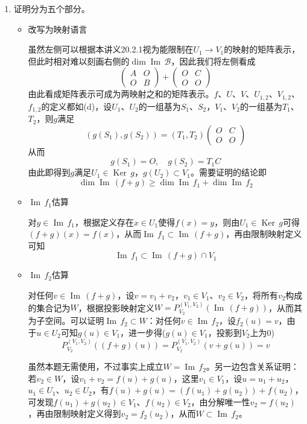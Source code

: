 \documentclass[a4paper,UTF8,fontset=windows,AutoFakeBold]{ctexart}
\DeclareMathOperator{\im}{Im\,}
\DeclareMathOperator{\Ker}{Ker\,}
\newcommand*{\mb}{\mathcal{B}}
\newcommand*{\note}{\noindent *}
\begin{document}
\begin{enumerate}
\begin{enumerate}
        \item 
        证明分为五个部分。
        \begin{itemize}
            \item 改写为映射语言
            
            虽然左侧可以根据本讲义20.2.1视为能限制在$U_1\to V_1$的映射的矩阵表示，但此时相对难以刻画右侧的$\dim\im\mb$，因此我们将左侧看成
            $$\begin{pmatrix}A&O\\O&B\end{pmatrix}+\begin{pmatrix}O&C\\O&O\end{pmatrix}$$
            由此看成矩阵表示可成为两映射之和的矩阵表示。$f$、$U$、$V$、$U_{1,2}$、$V_{1,2}$、$f_{1,2}$的定义都如(d)，设$U_1$、$U_2$的一组基为$S_1$、$S_2$，$V_1$、$V_2$的一组基为$T_1$、$T_2$，则$g$满足
            $$(g(S_1),g(S_2))=(T_1,T_2)\begin{pmatrix}O&C\\O&O\end{pmatrix}$$
            从而
            $$g(S_1)=O,\quad g(S_2)=T_1C$$
            由此即得到$g$满足$U_1\in\Ker g$，$g(U_2)\subset V_1$。需要证明的结论即
            $$\dim\im(f+g)\ge\dim\im f_1+\dim\im f_2$$

            \item $\im f_1$估算
            
            对$y\in\im f_1$，根据定义存在$x\in U_1$使得$f(x)=y$，则由$U_1\in\Ker g$可得$(f+g)(x)=f(x)$，从而$\im f_1\subset\im(f+g)$，再由限制映射定义可知
            $$\im f_1\subset\im(f+g)\cap V_1$$

            \item $\im f_2$估算
            
            对任何$v\in\im(f+g)$，设$v=v_1+v_2$，$v_1\in V_1$、$v_2\in V_2$，将所有$v_2$构成的集合记为$W$，根据投影映射定义$W=P_{V_2}^{(V_1,V_2)}(\im(f+g))$，从而其为子空间。可以证明$\im f_2\subset W$：对任何$v\in\im f_2$，设$f_2(u)=v$，由于$u\in U_2$可知$g(u)\in V_1$，进一步得($g(u)\in V_1$，投影到$V_2$上为0)
            $$P_{V_2}^{(V_1,V_2)}((f+g)(u))=P_{V_2}^{(V_1,V_2)}(v+g(u))=v$$

            \note 虽然本题无需使用，不过事实上成立$W=\im f_2$。另一边包含关系证明：若$v_2\in W$，设$v_1+v_2=f(u)+g(u)$，这里$v_1\in V_1$，设$u=u_1+u_2$，$u_1\in U_1$、$u_2\in U_2$，有$f(u)+g(u)=(f(u_1)+g(u_2))+f(u_2)$，可发现$f(u_1)+g(u_2)\in V_1$、$f(u_2)\in V_2$，由分解唯一性$v_2=f(u_2)$，再由限制映射定义得到$v_2=f_2(u_2)$，从而$W\subset\im f_2$。


\end{itemize}
\end{enumerate}
\end{enumerate}
\end{document}
